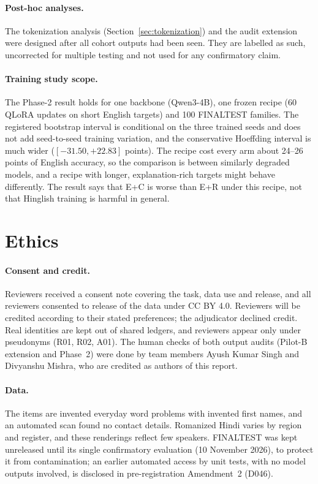 \documentclass[12pt,a4paper,oneside]{report}
\renewcommand{\_}{\oldunderscore\allowbreak}
\begin{document}
\paragraph{Post-hoc analyses.} The tokenization analysis (Section~\ref{sec:tokenization}) and the audit extension were designed after all cohort outputs had been seen. They are labelled as such, uncorrected for multiple testing and not used for any confirmatory claim.

\paragraph{Training study scope.} The Phase-2 result holds for one backbone (Qwen3-4B), one frozen recipe (60 QLoRA updates on short English targets) and 100 FINAL\_TEST families. The registered bootstrap interval is conditional on the three trained seeds and does not add seed-to-seed training variation, and the conservative Hoeffding interval is much wider ($[-31.50, +22.83]$ points). The recipe cost every arm about 24--26 points of English accuracy, so the comparison is between similarly degraded models, and a recipe with longer, explanation-rich targets might behave differently. The result says that E+C is worse than E+R under this recipe, not that Hinglish training is harmful in general.

\section{Ethics}

\paragraph{Consent and credit.} Reviewers received a consent note covering the task, data use and release, and all reviewers consented to release of the data under CC BY 4.0. Reviewers will be credited according to their stated preferences; the adjudicator declined credit. Real identities are kept out of shared ledgers, and reviewers appear only under pseudonyms (R01, R02, A01). The human checks of both output audits (Pilot-B extension and Phase~2) were done by team members Ayush Kumar Singh and Divyanshu Mishra, who are credited as authors of this report.

\paragraph{Data.} The items are invented everyday word problems with invented first names, and an automated scan found no contact details. Romanized Hindi varies by region and register, and these renderings reflect few speakers. FINAL\_TEST was kept unreleased until its single confirmatory evaluation (10 November 2026), to protect it from contamination; an earlier automated access by unit tests, with no model outputs involved, is disclosed in pre-registration Amendment~2 (D046).
\end{document}
